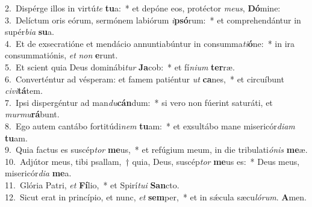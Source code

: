{2.~}Dispérge illos in virtú\textit{te} \textbf{tu}a:~* et depóne eos, protéctor \textit{me}\textit{us}, \textbf{Dó}mine:\\
{3.~}Delíctum oris eórum, sermónem labiórum \textit{i}\textbf{psó}rum:~* et comprehendántur in supér\textit{bi}\textit{a} \textbf{su}a.\\
{4.~}Et de exsecratióne et mendácio annuntiabúntur in consumma\textit{ti}\textbf{ó}ne:~* in ira consummatiónis, \textit{et} \textit{non} \textbf{e}runt.\\
{5.~}Et scient quia Deus dominábi\textit{tur} \textbf{Ja}cob:~* et fí\textit{ni}\textit{um} \textbf{ter}ræ.\\
{6.~}Converténtur ad vésperam: et famem patiéntur \textit{ut} \textbf{ca}nes,~* et circuíbunt \textit{ci}\textit{vi}\textbf{tá}tem.\\
{7.~}Ipsi dispergéntur ad man\textit{du}\textbf{cán}dum:~* si vero non fúerint saturáti, et \textit{mur}\textit{mu}\textbf{rá}bunt.\\
{8.~}Ego autem cantábo fortitúdi\textit{nem} \textbf{tu}am:~* et exsultábo mane misericór\textit{di}\textit{am} \textbf{tu}am.\\
{9.~}Quia factus es suscép\textit{tor} \textbf{me}us,~* et refúgium meum, in die tribulati\textit{ó}\textit{nis} \textbf{me}æ.\\
{10.~}Adjútor meus, tibi psallam,~† quia, Deus, suscép\textit{tor} \textbf{me}us es:~* Deus meus, misericór\textit{di}\textit{a} \textbf{me}a.\\
{11.~}Glória Patri, \textit{et} \textbf{Fí}lio,~* et Spirí\textit{tu}\textit{i} \textbf{San}cto.\\
{12.~}Sicut erat in princípio, et nunc, \textit{et} \textbf{sem}per,~* et in sǽcula sæcu\textit{ló}\textit{rum}. \textbf{A}men.\\
